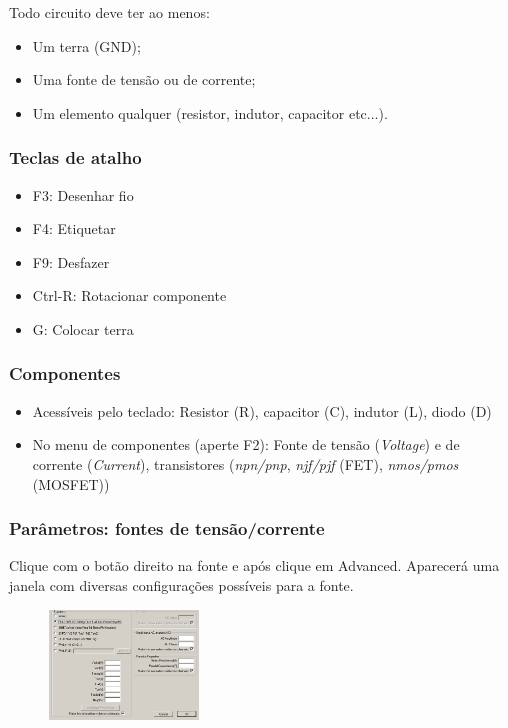 \documentclass{beamer}
\begin{document}
\begin{frame}
Todo circuito deve ter ao menos:
\begin{itemize}
\item Um terra (GND);
\item Uma fonte de tensão ou de corrente;
\item Um elemento qualquer (resistor, indutor, capacitor etc...).
\end{itemize}
\end{frame}
\begin{frame}
\frametitle{Teclas de atalho}
\begin{itemize}
\item{F3:} Desenhar fio
\item{F4:} Etiquetar
\item{F9:} Desfazer 
\item{Ctrl-R:} Rotacionar componente
\item{G:} Colocar terra

\end{itemize}
\end{frame}

\begin{frame}
\frametitle{Componentes}
\begin{itemize}
\item {Acessíveis pelo teclado:} Resistor (R), capacitor (C), indutor (L), diodo (D)
\item {No menu de componentes (aperte F2)}: Fonte de tensão (\textit{Voltage}) e de corrente (\textit{Current}), transistores (\textit{npn/pnp}, \textit{njf/pjf} (FET), \textit{nmos/pmos} (MOSFET))
\end{itemize}
\end{frame}

\begin{frame}
\frametitle{Parâmetros: fontes de tensão/corrente}
Clique com o botão direito na fonte e após clique em Advanced. Aparecerá uma janela com diversas configurações possíveis para a fonte.
\begin{figure}[htb]
\includegraphics[width=150px]{images/paramfonte.png}
\end{figure}
\end{frame}
\end{document}
